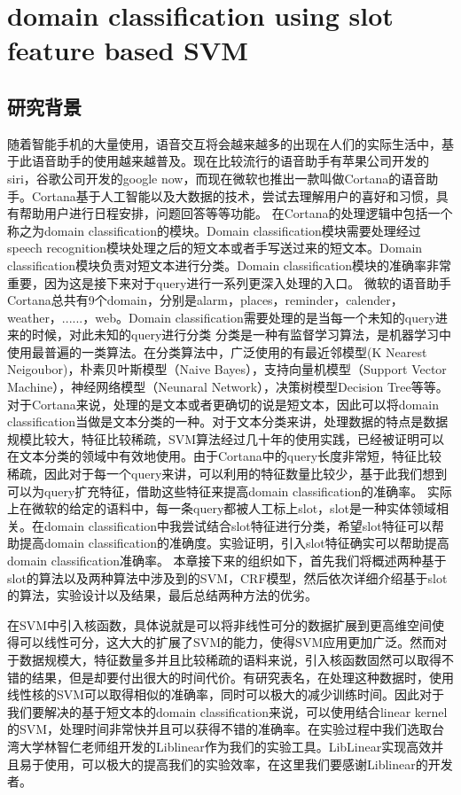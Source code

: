 \documentclass[master]{njuthesis}
\begin{document}
\chapter{domain classification using slot feature based SVM}\label{chapter_smallworld}

\section{研究背景}

    随着智能手机的大量使用，语音交互将会越来越多的出现在人们的实际生活中，基于此语音助手的使用越来越普及。现在比较流行的语音助手有苹果公司开发的siri，谷歌公司开发的google now，而现在微软也推出一款叫做Cortana的语音助手。Cortana基于人工智能以及大数据的技术，尝试去理解用户的喜好和习惯，具有帮助用户进行日程安排，问题回答等等功能。
    在Cortana的处理逻辑中包括一个称之为domain classification的模块。Domain classification模块需要处理经过speech recognition模块处理之后的短文本或者手写送过来的短文本。Domain classification模块负责对短文本进行分类。Domain classification模块的准确率非常重要，因为这是接下来对于query进行一系列更深入处理的入口。
    微软的语音助手Cortana总共有9个domain，分别是alarm，places，reminder，calender，weather，......，web。Domain classification需要处理的是当每一个未知的query进来的时候，对此未知的query进行分类
    分类是一种有监督学习算法，是机器学习中使用最普遍的一类算法。在分类算法中，广泛使用的有最近邻模型(K Nearest Neigoubor)，朴素贝叶斯模型（Naive Bayes），支持向量机模型（Support Vector Machine），神经网络模型（Neunaral Network），决策树模型Decision Tree等等。对于Cortana来说，处理的是文本或者更确切的说是短文本，因此可以将domain classification当做是文本分类的一种。对于文本分类来讲，处理数据的特点是数据规模比较大，特征比较稀疏，SVM算法经过几十年的使用实践，已经被证明可以在文本分类的领域中有效地使用。由于Cortana中的query长度非常短，特征比较稀疏，因此对于每一个query来讲，可以利用的特征数量比较少，基于此我们想到可以为query扩充特征，借助这些特征来提高domain classification的准确率。
    实际上在微软的给定的语料中，每一条query都被人工标上slot，slot是一种实体领域相关。在domain classification中我尝试结合slot特征进行分类，希望slot特征可以帮助提高domain classification的准确度。实验证明，引入slot特征确实可以帮助提高domain classification准确率。
    本章接下来的组织如下，首先我们将概述两种基于slot的算法以及两种算法中涉及到的SVM，CRF模型，然后依次详细介绍基于slot的算法，实验设计以及结果，最后总结两种方法的优劣。

    在SVM中引入核函数，具体说就是可以将非线性可分的数据扩展到更高维空间使得可以线性可分，这大大的扩展了SVM的能力，使得SVM应用更加广泛。然而对于数据规模大，特征数量多并且比较稀疏的语料来说，引入核函数固然可以取得不错的结果，但是却要付出很大的时间代价。有研究表名，在处理这种数据时，使用线性核的SVM可以取得相似的准确率，同时可以极大的减少训练时间。因此对于我们要解决的基于短文本的domain classification来说，可以使用结合linear kernel的SVM，处理时间非常快并且可以获得不错的准确率。在实验过程中我们选取台湾大学林智仁老师组开发的Liblinear作为我们的实验工具。LibLinear实现高效并且易于使用，可以极大的提高我们的实验效率，在这里我们要感谢Liblinear的开发者。
    
\end{document}
